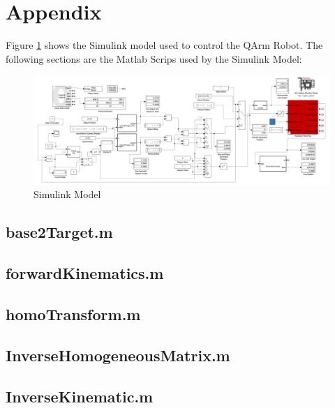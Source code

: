 \onecolumn
\section{Appendix}
Figure \ref{Fig:SimulinkModel} shows the Simulink model used to control the QArm Robot. The following sections are the Matlab Scrips used by the Simulink Model: 

\begin{figure}[htb]
\centering
\includegraphics[width=\textwidth]{Figures/SimulinkModel.png}
\caption{Simulink Model}
\label{Fig:SimulinkModel}
\centering
\end{figure}

\subsection{base2Target.m}



\subsection{forwardKinematics.m}



\subsection{homoTransform.m}



\subsection{InverseHomogeneousMatrix.m}



\subsection{InverseKinematic.m}


